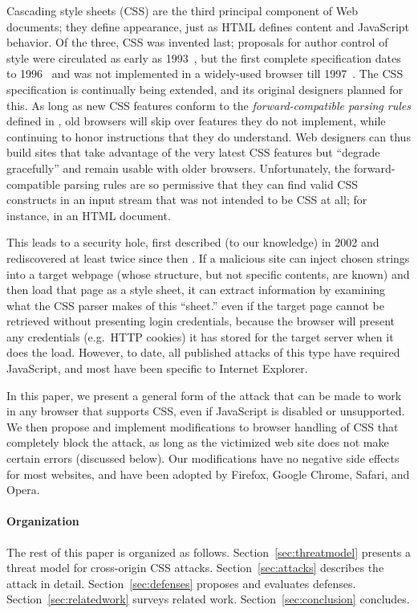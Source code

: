 \documentclass{acm_proc_article-sp}
\begin{document}
Cascading style sheets (CSS) are the third principal component of Web
documents; they define appearance, just as HTML defines content and
JavaScript behavior.  Of the three, CSS was invented last; proposals
for author control of style were circulated as early as
1993~\cite{css-history}, but the first complete specification dates to
1996~\cite{css1} and was not implemented in a widely-used browser till
1997~\cite{eich}.  The CSS specification is continually being
extended, and its original designers planned for this.  As long as new
CSS features conform to the \emph{forward-compatible parsing rules}
defined in \cite{syndata}, old browsers will skip over features they
do not implement, while continuing to honor instructions that they do
understand.  Web designers can thus build sites that take advantage of
the very latest CSS features but “degrade gracefully” and remain
usable with older browsers.  Unfortunately, the forward-compatible
parsing rules are so permissive that they can find valid CSS
constructs in an input stream that was not intended to be CSS at all;
for instance, in an HTML document.

This leads to a security hole, first described (to our knowledge) in
2002 \cite{cssxss02} and rediscovered at least twice since then
\cite{cssxss05,cssxss08}.  If a malicious site can inject chosen
strings into a target webpage (whose structure, but not specific
contents, are known) and then load that page as a style sheet, it can
extract information by examining what the CSS parser makes of this
“sheet.”  even if the target page cannot be retrieved
without presenting login credentials, because the browser will present
any credentials (e.g.\ HTTP cookies) it has stored for the target
server when it does the load.  However, to date, all published attacks
of this type have required JavaScript, and most have been specific to
Internet Explorer.

In this paper, we present a general form of the attack that can be
made to work in any browser that supports CSS, even if JavaScript is
disabled or unsupported.  We then propose and implement modifications
to browser handling of CSS that completely block the attack, as long
as the victimized web site does not make certain errors (discussed
below).  Our modifications have no negative side effects for most
websites, and have been adopted by Firefox, Google Chrome, Safari, and
Opera.

\paragraph{Organization}
The rest of this paper is organized as follows. Section~\ref{sec:threatmodel} presents a threat model for cross-origin CSS attacks.
Section~\ref{sec:attacks} describes the attack in detail. Section~\ref{sec:defenses} proposes and evaluates defenses.
Section~\ref{sec:relatedwork} surveys related work.
Section~\ref{sec:conclusion} concludes.
\end{document}
